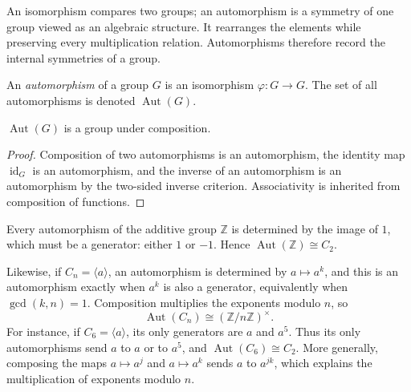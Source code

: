 An isomorphism compares two groups; an automorphism is a symmetry of one group
viewed as an algebraic structure. It rearranges the elements while preserving
every multiplication relation. Automorphisms therefore record the internal
symmetries of a group.

\begin{definition}
An \emph{automorphism} of a group \(G\) is an isomorphism
\(\varphi:G\to G\). The set of all automorphisms is denoted
\(\operatorname{Aut}(G)\).
\end{definition}

\begin{proposition}
\(\operatorname{Aut}(G)\) is a group under composition.
\end{proposition}
\begin{proof}
Composition of two automorphisms is an automorphism, the identity map
\(\operatorname{id}_G\) is an automorphism, and the inverse of an
automorphism is an automorphism by the two-sided inverse criterion.
Associativity is inherited from composition of functions.
\end{proof}

\begin{example}
Every automorphism of the additive group \(\mathbb Z\) is determined by the
image of \(1\), which must be a generator: either \(1\) or \(-1\). Hence
\(\operatorname{Aut}(\mathbb Z)\cong C_2\).

Likewise, if \(C_n=\langle a\rangle\), an automorphism is determined by
\(a\mapsto a^k\), and this is an automorphism exactly when \(a^k\) is also a
generator, equivalently when \(\gcd(k,n)=1\). Composition multiplies the
exponents modulo \(n\), so
\[
\operatorname{Aut}(C_n)\cong(\mathbb Z/n\mathbb Z)^\times.
\]
For instance, if \(C_6=\langle a\rangle\), its only generators are \(a\) and
\(a^5\). Thus its only automorphisms send \(a\) to \(a\) or to \(a^5\), and
\(\operatorname{Aut}(C_6)\cong C_2\). More generally, composing the maps
\(a\mapsto a^j\) and \(a\mapsto a^k\) sends \(a\) to \(a^{jk}\), which
explains the multiplication of exponents modulo \(n\).
\end{example}

